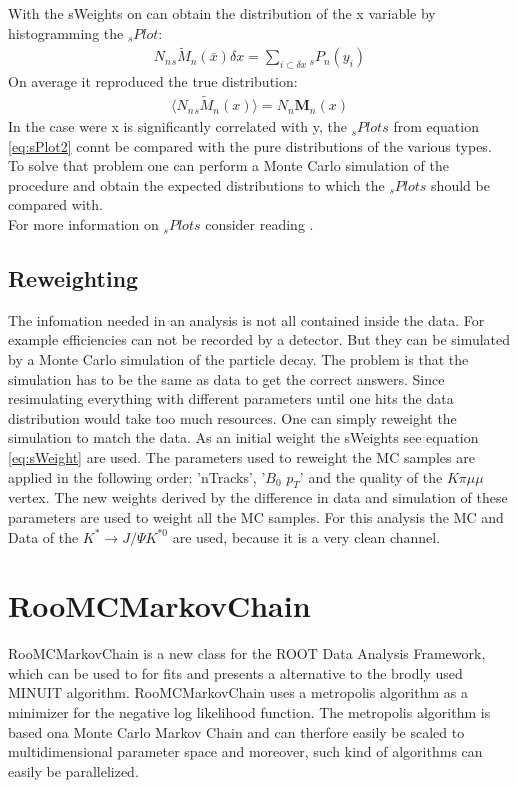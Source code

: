 \documentclass[english]{uzhpub}
\begin{document}
With the sWeights on can obtain the distribution of the x variable by histogramming the $_s Plot$:
\begin{align}
 N_n { }_{s} \tilde{M}_n (\bar{x}) \delta x = \sum_{i \subset \delta x} { }_{s} P_n (y_i) \label{eq:sPlot2}
\end{align}
On average it reproduced the true distribution:
\begin{align}
 \langle N_n { }_s \tilde{M}_n (x) \rangle = N_n \textbf{M}_n (x)
\end{align}
In the case were x is significantly correlated with y, the $_s Plots$ from equation \ref{eq:sPlot2} connt be compared with the pure distributions of the various types. To solve that problem one can perform a Monte Carlo simulation of the procedure and obtain the expected distributions to which the $_s Plots$ should be compared with. \\
For more information on $_s Plots$ consider reading \cite{bib:sPlot}.


\subsection{Reweighting}
The infomation needed in an analysis is not all contained inside the data. For example efficiencies can not be recorded by a detector. But they can be simulated by a Monte Carlo simulation of the particle decay. The problem is that the simulation has to be the same as data to get the correct answers. Since resimulating everything with different parameters until one hits the data distribution would take too much resources. One can simply reweight the simulation to match the data. As an initial weight the sWeights see equation \ref{eq:sWeight} are used. The parameters used to reweight the MC samples are applied in the following order: 'nTracks', '$B_0$ $p_T$' and the quality of the $K \pi \mu \mu$ vertex. The new weights derived by the difference in data and simulation of these parameters are used to weight all the MC samples. For this analysis the MC and Data of the $K^* \rightarrow J/ \Psi K^{*0}$ are used, because it is a very clean channel.




\section{RooMCMarkovChain}
RooMCMarkovChain is a new class for the ROOT Data Analysis Framework, which can be used to for fits and presents a alternative to the brodly used MINUIT algorithm. RooMCMarkovChain uses a metropolis algorithm as a minimizer for the negative log likelihood function. The metropolis algorithm is based ona Monte Carlo Markov Chain and can therfore easily be scaled to multidimensional parameter space and moreover, such kind of algorithms can easily be parallelized.
\end{document}
